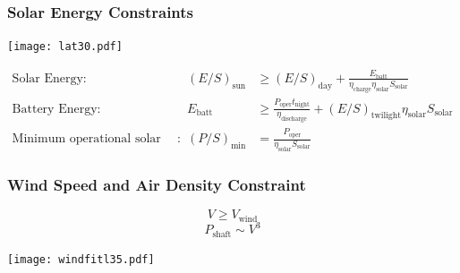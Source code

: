 \documentclass{beamer}
\begin{document}
\begin{frame}
    \frametitle{Solar Energy Constraints}

    \begin{center}
    \texttt{[image: lat30.pdf]}
    \end{center}
    
    \pause
    \scriptsize
    \[ \begin{array}{rrl}
        \text{Solar Energy} : & (E/S)_{\text{sun}}  &\geq (E/S)_{\text{day}} + \frac{E_{\text{batt}}}{\eta_{\text{charge}}\eta_{\text{solar}} S_{\text{solar}}} \\
        \text{Battery Energy} : &E_{\text{batt}} &\geq \frac{P_{\text{oper}}t_{\text{night}}}{\eta_{\text{discharge}}} + (E/S)_{\text{twilight}} \eta_{\text{solar}} S_{\text{solar}} \\
        \text{Minimum operational solar power} : & (P/S)_{\text{min}} &= \frac{P_{\text{oper}}}{\eta_{\text{solar}} S_{\text{solar}}} 
    \end{array} \]

\end{frame}

\begin{frame}
    \frametitle{Wind Speed and Air Density Constraint}

    \pause
    \[ V \geq V_{\text{wind}} \]
        \pause
    \[P_{\text{shaft}} \sim V^3 \]

    \pause
    \begin{center}
    \texttt{[image: windfitl35.pdf]}
    \end{center}

\end{frame}
\end{document}
